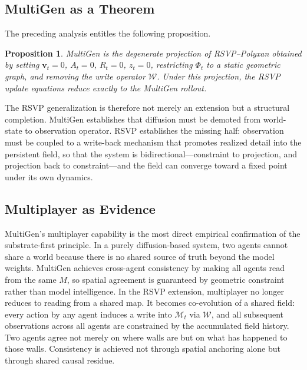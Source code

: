 \documentclass[11pt]{article}
\newtheorem{proposition}[theorem]{Proposition}
\begin{document}
\subsection{MultiGen as a Theorem}

The preceding analysis entitles the following proposition.

\begin{proposition}
MultiGen is the degenerate projection of RSVP--Polyxan obtained by
setting $\mathbf{v}_t = 0$, $A_t = 0$, $R_t = 0$, $z_t = 0$,
restricting $\Phi_t$ to a static geometric graph, and removing the
write operator $\mathcal{W}$.
Under this projection, the RSVP update equations reduce exactly to the
MultiGen rollout.
\end{proposition}

The RSVP generalization is therefore not merely an extension but a
structural completion.
MultiGen establishes that diffusion must be demoted from world-state to
observation operator.
RSVP establishes the missing half: observation must be coupled to a
write-back mechanism that promotes realized detail into the persistent
field, so that the system is bidirectional---constraint to projection,
and projection back to constraint---and the field can converge toward
a fixed point under its own dynamics.

\subsection{Multiplayer as Evidence}

MultiGen's multiplayer capability is the most direct empirical confirmation
of the substrate-first principle.
In a purely diffusion-based system, two agents cannot share a world because
there is no shared source of truth beyond the model weights.
MultiGen achieves cross-agent consistency by making all agents read from
the same $M$, so spatial agreement is guaranteed by geometric constraint
rather than model intelligence.
In the RSVP extension, multiplayer no longer reduces to reading from a
shared map.
It becomes co-evolution of a shared field: every action by any agent
induces a write into $\mathcal{M}_t$ via $\mathcal{W}$, and all subsequent
observations across all agents are constrained by the accumulated field
history.
Two agents agree not merely on where walls are but on what has happened to
those walls.
Consistency is achieved not through spatial anchoring alone but through
shared causal residue.

\end{document}
